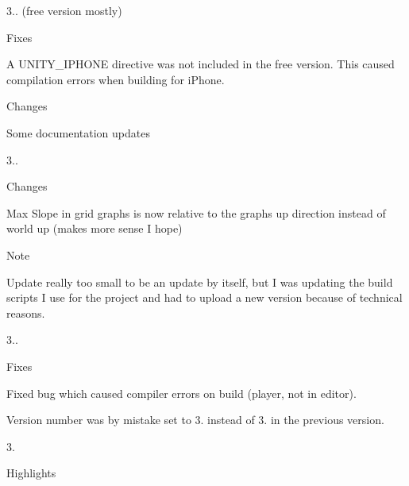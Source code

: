 \begin{DoxyItemize}
\begin{DoxyItemize}
\begin{DoxyItemize}
\end{DoxyItemize}
\end{DoxyItemize}
\item 3.. (free version mostly)
\begin{DoxyItemize}
\item Fixes
\begin{DoxyItemize}
\item A U\+N\+I\+T\+Y\+\_\+\+I\+P\+H\+O\+NE directive was not included in the free version. This caused compilation errors when building for i\+Phone.
\end{DoxyItemize}
\item Changes
\begin{DoxyItemize}
\item Some documentation updates
\end{DoxyItemize}
\end{DoxyItemize}
\item 3..
\begin{DoxyItemize}
\item Changes
\begin{DoxyItemize}
\item Max Slope in grid graphs is now relative to the graph\textquotesingle{}s up direction instead of world up (makes more sense I hope)
\end{DoxyItemize}
\item Note
\begin{DoxyItemize}
\item Update really too small to be an update by itself, but I was updating the build scripts I use for the project and had to upload a new version because of technical reasons.
\end{DoxyItemize}
\end{DoxyItemize}
\item 3..
\begin{DoxyItemize}
\item Fixes
\begin{DoxyItemize}
\item Fixed bug which caused compiler errors on build (player, not in editor).
\item Version number was by mistake set to 3. instead of 3. in the previous version.
\end{DoxyItemize}
\end{DoxyItemize}
\item 3.
\begin{DoxyItemize}
\item Highlights
\begin{DoxyItemize}

\end{DoxyItemize}
\end{DoxyItemize}
\end{DoxyItemize}
